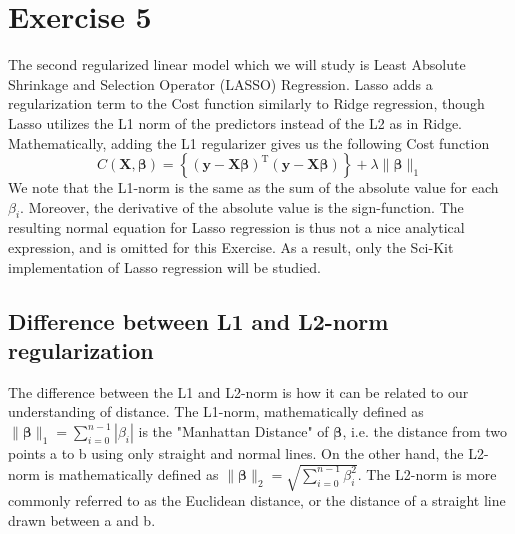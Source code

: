 \documentclass[11pt, a4paper]{article}
\begin{document}
\section*{Exercise 5}
The second regularized linear model which we will study is Least Absolute Shrinkage and Selection Operator (LASSO) Regression. Lasso adds a regularization term to the Cost function similarly to Ridge regression, though Lasso utilizes the L1 norm of the predictors instead of the L2 as in Ridge. \cite{Geron2019} Mathematically, adding the L1 regularizer gives us the following Cost function
\[
  C\left(\bm{X},\bm{\beta}\right) = \left\{\left(\bm{y}-\bm{X}\bm{\beta}\right)^\text{T}\left(\bm{y}-\bm{X}\bm{\beta}\right)\right\}+\lambda\lVert \bm{\beta}\rVert_1
\]
We note that the L1-norm is the same as the sum of the absolute value for each $\beta_i$. Moreover, the derivative of the absolute value is the sign-function. The resulting normal equation for Lasso regression is thus not a nice analytical expression, and is omitted for this Exercise. As a result, only the Sci-Kit implementation of Lasso regression will be studied.

\subsection*{Difference between L1 and L2-norm regularization}
The difference between the L1 and L2-norm is how it can be related to our understanding of distance. The L1-norm, mathematically defined as $\lVert \bm{\beta} \rVert_1 = \sum_{i=0}^{n-1}|\beta_i|$ is the "Manhattan Distance" of $\bm{\beta}$, i.e. the distance from two points a to b using only straight and normal lines. On the other hand, the L2-norm is mathematically defined as $\lVert \bm{\beta} \rVert_2 = \sqrt{\sum_{i=0}^{n-1}\beta_i^2}$. The L2-norm is more commonly referred to as the Euclidean distance, or the distance of a straight line drawn between a and b.
\end{document}
